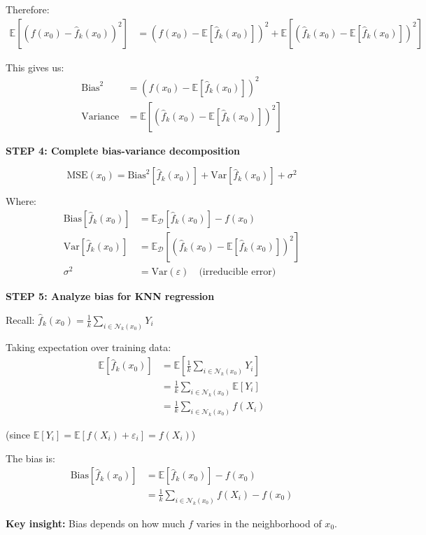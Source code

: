 \documentclass[12pt]{article}
\begin{document}
\begin{solution}
Therefore:
\begin{align*}
\mathbb{E}[(f(x_0) - \hat{f}_k(x_0))^2] &= (f(x_0) - \mathbb{E}[\hat{f}_k(x_0)])^2 + \mathbb{E}[(\hat{f}_k(x_0) - \mathbb{E}[\hat{f}_k(x_0)])^2]
\end{align*}

This gives us:
\begin{align*}
\text{Bias}^2 &= (f(x_0) - \mathbb{E}[\hat{f}_k(x_0)])^2 \\
\text{Variance} &= \mathbb{E}[(\hat{f}_k(x_0) - \mathbb{E}[\hat{f}_k(x_0)])^2]
\end{align*}

\textbf{STEP 4: Complete bias-variance decomposition}

\[
\boxed{\text{MSE}(x_0) = \text{Bias}^2[\hat{f}_k(x_0)] + \text{Var}[\hat{f}_k(x_0)] + \sigma^2}
\]

Where:
\begin{align*}
\text{Bias}[\hat{f}_k(x_0)] &= \mathbb{E}_{\mathcal{D}}[\hat{f}_k(x_0)] - f(x_0) \\
\text{Var}[\hat{f}_k(x_0)] &= \mathbb{E}_{\mathcal{D}}[(\hat{f}_k(x_0) - \mathbb{E}[\hat{f}_k(x_0)])^2] \\
\sigma^2 &= \text{Var}(\varepsilon) \quad \text{(irreducible error)}
\end{align*}

\textbf{STEP 5: Analyze bias for KNN regression}

Recall: \(\hat{f}_k(x_0) = \frac{1}{k} \sum_{i \in \mathcal{N}_k(x_0)} Y_i\)

Taking expectation over training data:
\begin{align*}
\mathbb{E}[\hat{f}_k(x_0)] &= \mathbb{E}\left[\frac{1}{k} \sum_{i \in \mathcal{N}_k(x_0)} Y_i\right] \\
&= \frac{1}{k} \sum_{i \in \mathcal{N}_k(x_0)} \mathbb{E}[Y_i] \\
&= \frac{1}{k} \sum_{i \in \mathcal{N}_k(x_0)} f(X_i)
\end{align*}

(since \(\mathbb{E}[Y_i] = \mathbb{E}[f(X_i) + \varepsilon_i] = f(X_i)\))

The bias is:
\begin{align*}
\text{Bias}[\hat{f}_k(x_0)] &= \mathbb{E}[\hat{f}_k(x_0)] - f(x_0) \\
&= \frac{1}{k} \sum_{i \in \mathcal{N}_k(x_0)} f(X_i) - f(x_0)
\end{align*}

\textbf{Key insight:} Bias depends on how much \(f\) varies in the neighborhood of \(x_0\).


\end{solution}
\end{document}
